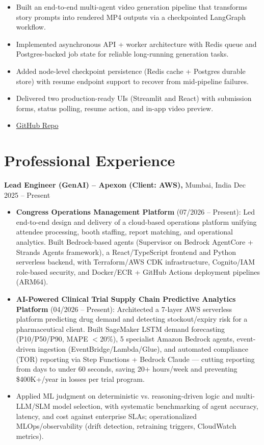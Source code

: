 \documentclass[a4paper,10pt]{article}
\begin{document}
\begin{itemize}[leftmargin=0.5cm]
\begin{itemize}[leftmargin=0.45cm]
    \item Built an end-to-end multi-agent video generation pipeline that transforms story prompts into rendered MP4 outputs via a checkpointed LangGraph workflow.
    \item Implemented asynchronous API + worker architecture with Redis queue and Postgres-backed job state for reliable long-running generation tasks.
    \item Added node-level checkpoint persistence (Redis cache + Postgres durable store) with resume endpoint support to recover from mid-pipeline failures.
    \item Delivered two production-ready UIs (Streamlit and React) with submission forms, status polling, resume action, and in-app video preview.
    \item \href{https://github.com/JaydipSingh/agentic-video-generator}{GitHub Repo}
  \end{itemize}
\end{itemize}

\section{Professional Experience}

\textbf{Lead Engineer (GenAI) – Apexon (Client: AWS),} Mumbai, India  \hfill Dec 2025 – Present
\begin{itemize}[leftmargin=0.5cm]
\item \textbf{Congress Operations Management Platform} (07/2026 – Present): Led end-to-end design and delivery of a cloud-based operations platform unifying attendee processing, booth staffing, report matching, and operational analytics. Built Bedrock-based agents (Supervisor on Bedrock AgentCore + Strands Agents framework), a React/TypeScript frontend and Python serverless backend, with Terraform/AWS CDK infrastructure, Cognito/IAM role-based security, and Docker/ECR + GitHub Actions deployment pipelines (ARM64).
\item \textbf{AI-Powered Clinical Trial Supply Chain Predictive Analytics Platform} (04/2026 – Present): Architected a 7-layer AWS serverless platform predicting drug demand and detecting stockout/expiry risk for a pharmaceutical client. Built SageMaker LSTM demand forecasting (P10/P50/P90, MAPE $<$20\%), 5 specialist Amazon Bedrock agents, event-driven ingestion (EventBridge/Lambda/Glue), and automated compliance (TOR) reporting via Step Functions + Bedrock Claude --- cutting reporting from days to under 60 seconds, saving 20+ hours/week and preventing \$400K+/year in losses per trial program.
\item Applied ML judgment on deterministic vs. reasoning-driven logic and multi-LLM/SLM model selection, with systematic benchmarking of agent accuracy, latency, and cost against enterprise SLAs; operationalized MLOps/observability (drift detection, retraining triggers, CloudWatch metrics).
\end{itemize}
\end{document}
